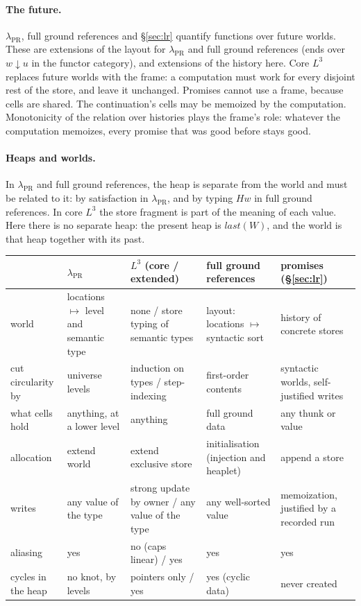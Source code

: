 \documentclass[11pt]{article}
\newcommand{\last}[1]{\mathit{last}(#1)}
\begin{document}
\paragraph{The future.}
$\lambda_{\mathrm{PR}}$, full ground references and \S\ref{sec:lr} quantify
functions over future worlds. These are extensions of the layout for
$\lambda_{\mathrm{PR}}$ and full ground references (ends over
$w \downarrow u$ in the functor category), and extensions of the history
here. Core $L^3$ replaces future worlds with the frame: a computation must
work for every disjoint rest of the store, and leave it unchanged. Promises
cannot use a frame, because cells are shared. The continuation's cells may be
memoized by the computation. Monotonicity of the relation over histories
plays the frame's role: whatever the computation memoizes, every promise that
was good before stays good.

\paragraph{Heaps and worlds.}
In $\lambda_{\mathrm{PR}}$ and full ground references, the heap is separate
from the world and must be related to it: by satisfaction in
$\lambda_{\mathrm{PR}}$, and by typing $H w$ in full ground references. In
core $L^3$ the store fragment is part of the meaning of each value. Here
there is no separate heap: the present heap is $\last{W}$, and the world is
that heap together with its past.

\begin{center}
\small
\begin{tabular}{@{}p{2.6cm}p{4.1cm}p{4.1cm}p{4.1cm}p{4.1cm}@{}}
  & $\lambda_{\mathrm{PR}}$ & $L^3$ (core / extended)
  & full ground references & promises (\S\ref{sec:lr}) \\ \hline
  world & locations $\mapsto$ level and semantic type
    & none / store typing of semantic types
    & layout: locations $\mapsto$ syntactic sort
    & history of concrete stores \\
  cut circularity by & universe levels
    & induction on types / step-indexing
    & first-order contents & syntactic worlds, self-justified writes \\
  what cells hold & anything, at a lower level
    & anything & full ground data & any thunk or value \\
  allocation & extend world
    & extend exclusive store & initialisation (injection and heaplet)
    & append a store \\
  writes & any value of the type
    & strong update by owner / any value of the type
    & any well-sorted value & memoization, justified by a recorded run \\
  aliasing & yes & no (caps linear) / yes & yes & yes \\
  cycles in the heap & no knot, by levels & pointers only / yes & yes (cyclic data)
    & never created
\end{tabular}
\end{center}
\end{document}
